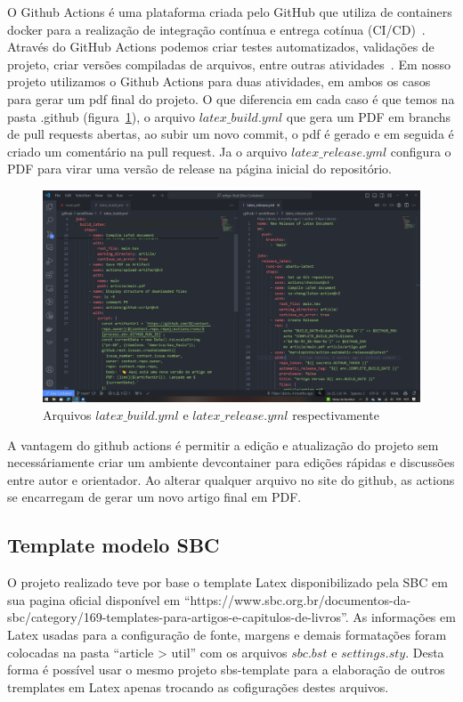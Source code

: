 O Github Actions é uma plataforma criada pelo GitHub que utiliza de containers docker para a realização de integração contínua e entrega cotínua (CI/CD)~\cite{github:02}. Através do GitHub Actions podemos criar testes automatizados, validações de projeto, criar versões compiladas de arquivos, entre outras atividades~\cite{github:02}. Em nosso projeto utilizamos o Github Actions para duas atividades, em ambos os casos para gerar um pdf final do projeto. O que diferencia em cada caso é que temos na pasta .github (figura~\ref{fig:image15}), o arquivo $latex\_build.yml$ que gera um PDF em branchs de pull requests abertas, ao subir um novo commit, o pdf é gerado e em seguida é criado um comentário na pull request. Ja o arquivo $latex\_release.yml$ configura o PDF para virar uma versão de release na página inicial do repositório.

\begin{figure}[ht]
	\centering
	\includegraphics[width=.5\textwidth]{./images/image15.png}
	\caption{Arquivos $latex\_build.yml$ e $latex\_release.yml$ respectivamente}
	\label{fig:image15}
\end{figure}

A vantagem do github actions é permitir a edição e atualização do projeto sem necessáriamente criar um ambiente devcontainer para edições rápidas e discussões entre autor e orientador. Ao alterar qualquer arquivo no site do github, as actions se encarregam de gerar um novo artigo final em PDF.

\subsection{Template modelo SBC}
O projeto realizado teve por base o template Latex disponibilizado pela SBC em sua pagina oficial disponível em ``https://www.sbc.org.br/documentos-da-sbc/category/169-templates-para-artigos-e-capitulos-de-livros''. As informações em Latex usadas para a configuração de fonte, margens e demais formatações foram colocadas na pasta ``article > util'' com os arquivos $sbc.bst$ e $settings.sty$. Desta forma é possível usar o mesmo projeto sbs-template para a elaboração de outros tremplates em Latex apenas trocando as cofigurações destes arquivos.